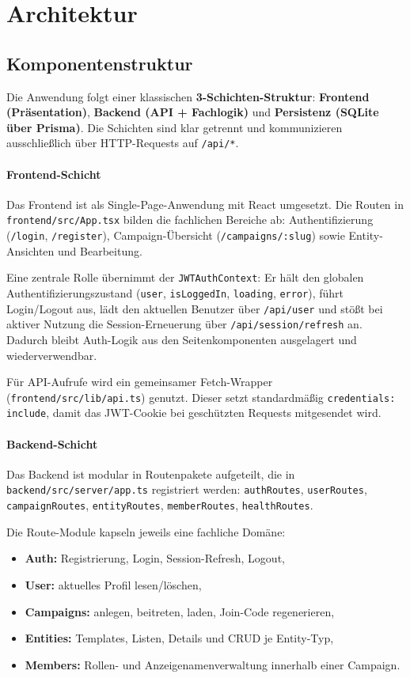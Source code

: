 \section{Architektur}

\subsection{Komponentenstruktur}

Die Anwendung folgt einer klassischen \textbf{3-Schichten-Struktur}:
\textbf{Frontend (Präsentation)}, \textbf{Backend (API + Fachlogik)} und
\textbf{Persistenz (SQLite über Prisma)}.
Die Schichten sind klar getrennt und kommunizieren ausschließlich über
HTTP-Requests auf \texttt{/api/*}.

\paragraph{Frontend-Schicht}
Das Frontend ist als Single-Page-Anwendung mit React umgesetzt.
Die Routen in \texttt{frontend/src/App.tsx} bilden die fachlichen Bereiche ab:
Authentifizierung (\texttt{/login}, \texttt{/register}), Campaign-Übersicht
(\texttt{/campaigns/:slug}) sowie Entity-Ansichten und Bearbeitung.

Eine zentrale Rolle übernimmt der \texttt{JWTAuthContext}:
Er hält den globalen Authentifizierungszustand (\texttt{user},
\texttt{isLoggedIn}, \texttt{loading}, \texttt{error}),
führt Login/Logout aus, lädt den aktuellen Benutzer über \texttt{/api/user}
und stößt bei aktiver Nutzung die Session-Erneuerung über
\texttt{/api/session/refresh} an.
Dadurch bleibt Auth-Logik aus den Seitenkomponenten ausgelagert und
wiederverwendbar.

Für API-Aufrufe wird ein gemeinsamer Fetch-Wrapper
(\texttt{frontend/src/lib/api.ts}) genutzt. Dieser setzt standardmäßig
\texttt{credentials: include}, damit das JWT-Cookie bei geschützten Requests
mitgesendet wird.

\paragraph{Backend-Schicht}
Das Backend ist modular in Routenpakete aufgeteilt, die in
\texttt{backend/src/server/app.ts} registriert werden:
\texttt{authRoutes}, \texttt{userRoutes}, \texttt{campaignRoutes},
\texttt{entityRoutes}, \texttt{memberRoutes}, \texttt{healthRoutes}.

Die Route-Module kapseln jeweils eine fachliche Domäne:
\begin{itemize}
  \item \textbf{Auth:} Registrierung, Login, Session-Refresh, Logout,
  \item \textbf{User:} aktuelles Profil lesen/löschen,
  \item \textbf{Campaigns:} anlegen, beitreten, laden, Join-Code regenerieren,
  \item \textbf{Entities:} Templates, Listen, Details und CRUD je Entity-Typ,
  \item \textbf{Members:} Rollen- und Anzeigenamenverwaltung innerhalb einer Campaign.
\end{itemize}

